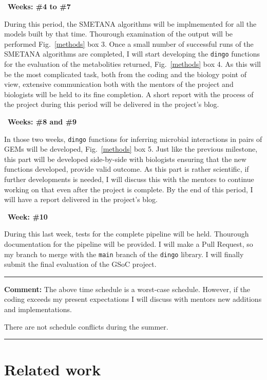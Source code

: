 \documentclass{article}
\begin{document}
\textbullet\ \textbf{Weeks: \#4 to \#7}

During this period, the SMETANA algorithms will be implmemented for all the models built by that time. 
Thourough examination of the output will be performed Fig.~\ref{methods} box 3. 
Once a small number of successful runs of the SMETANA algorithms are completed, I 
will start developing the \texttt{dingo} functions for the evaluation of the metabolities returned, Fig.~\ref{methods} box 4. 
As this will be the most complicated task, both from the coding and the biology point of view, 
extensive communication both with the mentors of the project and biologists will be held 
to its fine completion. 
A short report with the process of the project during this period will be delivered in the project's blog.


\textbullet\ \textbf{Weeks: \#8 and \#9}

In those two weeks, \texttt{dingo} functions for inferring microbial interactions 
in pairs of GEMs will be developed, Fig.~\ref{methods} box 5. 
Just like the previous milestone, this part will be developed side-by-side with 
biologists ensuring that the new functions developed, provide valid outcome. 
As this part is rather scientific, if further developments is needed, I will discuss this 
with the mentors to continue working on that even after the project is complete. 
By the end of this period, I will have a report delivered in the project's blog.


\textbullet\ \textbf{Week: \#10}

During this last week, tests for the complete pipeline will be held. 
Thourough documentation for the pipeline will be provided. 
I will make a Pull Request, so my branch to merge with the \texttt{main} branch of the \texttt{dingo} library. 
I will finally submit the final evaluation of the GSoC project.


\rule{\textwidth}{0.4pt}

\textbf{Comment:} The above time schedule is a worst-case schedule. 
However, if the coding exceeds my present expectations I will discuss with mentors new additions and implementations.

There are not schedule conflicts during the summer. 

\rule{\textwidth}{0.5pt}

\section{Related work}
\end{document}
